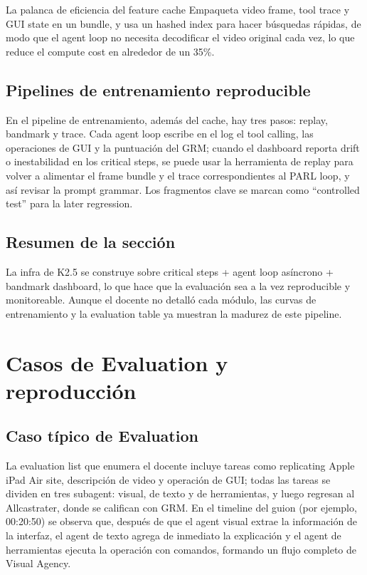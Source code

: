 \documentclass[a4paper]{article}
\begin{document}
\begin{importantbox}{La palanca de eficiencia del feature cache}
Empaqueta video frame, tool trace y GUI state en un bundle, y usa un hashed index para hacer búsquedas rápidas, de modo que el agent loop no necesita decodificar el video original cada vez, lo que reduce el compute cost en alrededor de un 35\%.
\end{importantbox}

\subsection{Pipelines de entrenamiento reproducible}
En el pipeline de entrenamiento, además del cache, hay tres pasos: replay, bandmark y trace. Cada agent loop escribe en el log el tool calling, las operaciones de GUI y la puntuación del GRM; cuando el dashboard reporta drift o inestabilidad en los critical steps, se puede usar la herramienta de replay para volver a alimentar el frame bundle y el trace correspondientes al PARL loop, y así revisar la prompt grammar. Los fragmentos clave se marcan como ``controlled test'' para la later regression.

\subsection{Resumen de la sección}
La infra de K2.5 se construye sobre critical steps + agent loop asíncrono + bandmark dashboard, lo que hace que la evaluación sea a la vez reproducible y monitoreable. Aunque el docente no detalló cada módulo, las curvas de entrenamiento y la evaluation table ya muestran la madurez de este pipeline.
\section{Casos de Evaluation y reproducción}

\subsection{Caso típico de Evaluation}
La evaluation list que enumera el docente incluye tareas como replicating Apple iPad Air site, descripción de video y operación de GUI; todas las tareas se dividen en tres subagent: visual, de texto y de herramientas, y luego regresan al Allcastrater, donde se califican con GRM. En el timeline del guion (por ejemplo, 00:20:50) se observa que, después de que el agent visual extrae la información de la interfaz, el agent de texto agrega de inmediato la explicación y el agent de herramientas ejecuta la operación con comandos, formando un flujo completo de Visual Agency.
\end{document}
